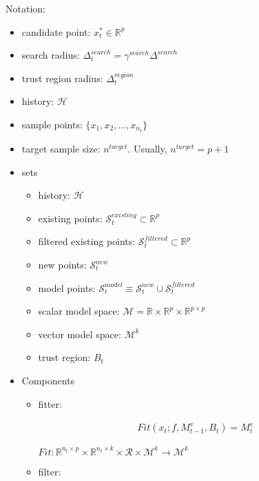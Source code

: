Notation:
\begin{itemize}
    \item candidate point: $x^*_t\in\mathbb{R}^p$
    \item search radius: $\Delta_t^{search}=\gamma^{search}\Delta^{search}$
    \item trust region radius: $\Delta_t^{region}$
    \item history: $\mathcal{H}$
    \item sample points: $\{x_1, x_2,...,x_{n_t}\}$
    \item target sample size: $n^{target}$. Usually, $n^{target}=p+1$
\end{itemize}

\begin{itemize}
    \item sets
        \begin{itemize}
            \item history: $\mathcal{H}$
            \item existing points: $\mathcal{S}^{existing}_t\subset\mathbb{R}^{p}$
            \item filtered existing points: $\mathcal{S}^{filtered}_t\subset\mathbb{R}^{p}$
            \item new points: $\mathcal{S}^{new}_t$
            \item model points: $\mathcal{S}^{model}_t\equiv\mathcal{S}^{new}_t\cup\mathcal{S}^{filtered}_t$
            \item scalar model space: $\mathcal{M}= \mathbb{R}\times\mathbb{R}^p\times\mathbb{R}^{p\times p}$
            \item vector model space: $\mathcal{M}^k$
            \item trust region: $B_t$

        \end{itemize}
    \item Components
        \begin{itemize}
            \item fitter:

            \begin{align}
                Fit(x_t;f,M^v_{t-1},B_t)=M_{t}^v
            \end{align}

                    $Fit:\mathbb{R}^{n_t\times p}\times\mathbb{R}^{n_t\times k}\times\mathcal{R}\times\mathcal{M}^k\rightarrow\mathcal{M}^k$

            \item filter:


\end{itemize}
\end{itemize}
